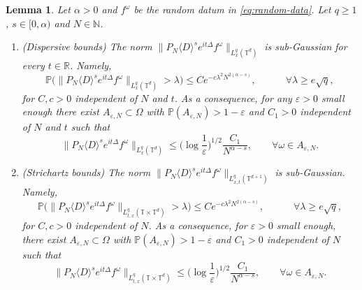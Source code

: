 \documentclass[11pt, xcolor = dvipsnames,reqno
]{amsart}
\newtheorem{lem}[thm]{Lemma}
\theoremstyle{definition}
\theoremstyle{remark}
\begin{document}
    \begin{lem}\label{lemma:Large_Deviation_Schrodinger_Linear}
Let $\alpha > 0$ and $f^{\omega}$ be the random datum in \eqref{eq:random-data}. 
Let $q \geq 1$,  $s \in [0,\alpha)$ and $N \in \mathbb N$.
    \begin{enumerate}
    \item (Dispersive bounds) The norm $\lVert P_N \langle D \rangle^s e^{it\Delta} f^\omega \rVert_{L_x^q(\mathbb T^d)}$ is sub-Gaussian for every $t \in \mathbb  R$. Namely,
    \begin{equation}
        \mathbb P \big( \lVert P_N \langle D\rangle^s e^{it\Delta} f^\omega \rVert_{L_x^q(\mathbb T^d)} > \lambda \big) \leq C e^{- c\lambda^2 N^{2(\alpha - s)}}, 
        \qquad \quad  \forall \lambda \geq e \sqrt q, 
    \end{equation}
    for $C,c>0$ independent of $N$ and $t$. 
    As a consequence, for any $\varepsilon > 0$ small enough there exist $A_{\varepsilon,N} \subset \Omega$ with $\mathbb P(A_{\varepsilon,N}) > 1-\varepsilon$ and $C_1 > 0$ independent of $N$ and $t$ such that
    \begin{equation}
        \lVert P_N \langle D \rangle^s e^{it\Delta} f^\omega \rVert_{L_x^q(\mathbb T^d)} 
        \leq \Big( \log \frac{1}{\varepsilon}\Big)^{1/2} \frac{C_1}{N^{\alpha - s}} , 
        \qquad \forall \omega \in A_{\varepsilon, N}. 
    \end{equation}

    \item (Strichartz bounds) The norm $\lVert P_N \langle D \rangle^s e^{it\Delta} f^\omega \rVert_{L^q_{x,t}(\mathbb T^{d+1})}$ is sub-Gaussian. Namely, 
    \begin{equation}
        \mathbb P \big( \lVert P_N \langle D \rangle^s e^{it\Delta} f^\omega \rVert_{L^q_{t,x}(\mathbb T \times \mathbb T^d)} > \lambda \big) \leq C e^{-c \lambda^2 N^{2(\alpha - s)}}, \qquad \quad \forall \lambda \geq e \sqrt q, 
    \end{equation}
    for $C,c>0$ independent of $N$. 
    As a consequence, for $\varepsilon > 0$ small enough, there exist $ A_{\varepsilon,N} \subset \Omega$ with $\mathbb P( A_{\varepsilon,N}) > 1-\varepsilon$ and $C_1 > 0$ independent of $N$ such that
    \begin{equation}
        \lVert P_N \langle D \rangle^s e^{it\Delta} f^\omega \rVert_{L_{t,x}^q (\mathbb T \times \mathbb T^d)} \leq 
        \Big( \log \frac{1}{\varepsilon}\Big)^{1/2} \frac{C_1}{N^{\alpha - s}},  
        \qquad \forall \omega \in A_{\varepsilon, N}. 
    \end{equation}
    \end{enumerate}
\end{lem}
\end{document}

